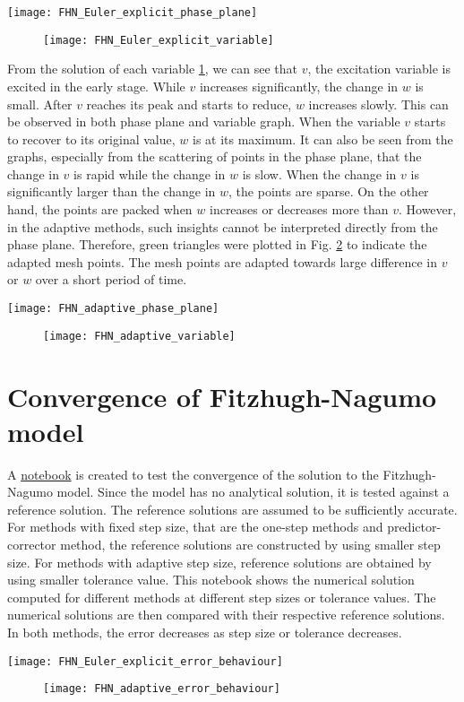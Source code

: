 \texttt{[image: FHN\_Euler\_explicit\_phase\_plane]}

\begin{figure}
    \texttt{[image: FHN\_Euler\_explicit\_variable]}
    \label{fig:Euler_explicit_variable}
\end{figure}


 From the solution of each variable \ref{fig:Euler_explicit_variable}, we can see that $v$, the excitation variable is excited in the early stage. While $v$ increases significantly, the change in $w$ is small. After $v$ reaches its peak and starts to reduce, $w$ increases slowly. This can be observed in both phase plane and variable graph. When the variable $v$ starts to recover to its original value, $w$ is at its maximum. It can also be seen from the graphs, especially from the scattering of points in the phase plane, that the change in $v$ is rapid while the change in $w$ is slow. When the change in $v$ is significantly larger than the change in $w$, the points are sparse. On the other hand, the points are packed when $w$ increases or decreases more than $v$. However, in the adaptive methods, such insights cannot be interpreted directly from the phase plane. Therefore, green triangles were plotted in Fig. \ref{fig:adaptive_variable} to indicate the adapted mesh points. The mesh points are adapted towards large difference in $v$ or $w$ over a short period of time.

 \texttt{[image: FHN\_adaptive\_phase\_plane]}

 \begin{figure}
    \texttt{[image: FHN\_adaptive\_variable]}
    \label{fig:adaptive_variable}
 \end{figure}

 \section{Convergence of Fitzhugh-Nagumo model}
A \href{https://nbviewer.jupyter.org/github/FarmHJ/numerical-solver/blob/main/examples/fhn_model_convergence.ipynb}{notebook} is created to test the convergence of the solution to the Fitzhugh-Nagumo model. Since the model has no analytical solution, it is tested against a reference solution. The reference solutions are assumed to be sufficiently accurate. For methods with fixed step size, that are the one-step methods and predictor-corrector method, the reference solutions are constructed by using smaller step size. For methods with adaptive step size, reference solutions are obtained by using smaller tolerance value. This notebook shows the numerical solution computed for different methods at different step sizes or tolerance values. The numerical solutions are then compared with their respective reference solutions. In both methods, the error decreases as step size or tolerance decreases.

\texttt{[image: FHN\_Euler\_explicit\_error\_behaviour]}
\begin{figure}
   \texttt{[image: FHN\_adaptive\_error\_behaviour]}
   \label{fig:adaptive_error}
\end{figure}
